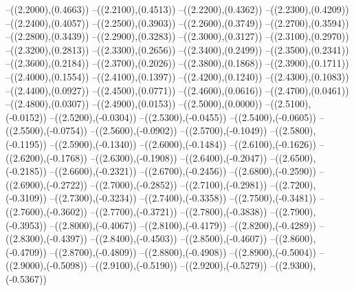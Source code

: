 {	--({\sx*(2.2000)},{\sy*(0.4663)})
	--({\sx*(2.2100)},{\sy*(0.4513)})
	--({\sx*(2.2200)},{\sy*(0.4362)})
	--({\sx*(2.2300)},{\sy*(0.4209)})
	--({\sx*(2.2400)},{\sy*(0.4057)})
	--({\sx*(2.2500)},{\sy*(0.3903)})
	--({\sx*(2.2600)},{\sy*(0.3749)})
	--({\sx*(2.2700)},{\sy*(0.3594)})
	--({\sx*(2.2800)},{\sy*(0.3439)})
	--({\sx*(2.2900)},{\sy*(0.3283)})
	--({\sx*(2.3000)},{\sy*(0.3127)})
	--({\sx*(2.3100)},{\sy*(0.2970)})
	--({\sx*(2.3200)},{\sy*(0.2813)})
	--({\sx*(2.3300)},{\sy*(0.2656)})
	--({\sx*(2.3400)},{\sy*(0.2499)})
	--({\sx*(2.3500)},{\sy*(0.2341)})
	--({\sx*(2.3600)},{\sy*(0.2184)})
	--({\sx*(2.3700)},{\sy*(0.2026)})
	--({\sx*(2.3800)},{\sy*(0.1868)})
	--({\sx*(2.3900)},{\sy*(0.1711)})
	--({\sx*(2.4000)},{\sy*(0.1554)})
	--({\sx*(2.4100)},{\sy*(0.1397)})
	--({\sx*(2.4200)},{\sy*(0.1240)})
	--({\sx*(2.4300)},{\sy*(0.1083)})
	--({\sx*(2.4400)},{\sy*(0.0927)})
	--({\sx*(2.4500)},{\sy*(0.0771)})
	--({\sx*(2.4600)},{\sy*(0.0616)})
	--({\sx*(2.4700)},{\sy*(0.0461)})
	--({\sx*(2.4800)},{\sy*(0.0307)})
	--({\sx*(2.4900)},{\sy*(0.0153)})
	--({\sx*(2.5000)},{\sy*(0.0000)})
	--({\sx*(2.5100)},{\sy*(-0.0152)})
	--({\sx*(2.5200)},{\sy*(-0.0304)})
	--({\sx*(2.5300)},{\sy*(-0.0455)})
	--({\sx*(2.5400)},{\sy*(-0.0605)})
	--({\sx*(2.5500)},{\sy*(-0.0754)})
	--({\sx*(2.5600)},{\sy*(-0.0902)})
	--({\sx*(2.5700)},{\sy*(-0.1049)})
	--({\sx*(2.5800)},{\sy*(-0.1195)})
	--({\sx*(2.5900)},{\sy*(-0.1340)})
	--({\sx*(2.6000)},{\sy*(-0.1484)})
	--({\sx*(2.6100)},{\sy*(-0.1626)})
	--({\sx*(2.6200)},{\sy*(-0.1768)})
	--({\sx*(2.6300)},{\sy*(-0.1908)})
	--({\sx*(2.6400)},{\sy*(-0.2047)})
	--({\sx*(2.6500)},{\sy*(-0.2185)})
	--({\sx*(2.6600)},{\sy*(-0.2321)})
	--({\sx*(2.6700)},{\sy*(-0.2456)})
	--({\sx*(2.6800)},{\sy*(-0.2590)})
	--({\sx*(2.6900)},{\sy*(-0.2722)})
	--({\sx*(2.7000)},{\sy*(-0.2852)})
	--({\sx*(2.7100)},{\sy*(-0.2981)})
	--({\sx*(2.7200)},{\sy*(-0.3109)})
	--({\sx*(2.7300)},{\sy*(-0.3234)})
	--({\sx*(2.7400)},{\sy*(-0.3358)})
	--({\sx*(2.7500)},{\sy*(-0.3481)})
	--({\sx*(2.7600)},{\sy*(-0.3602)})
	--({\sx*(2.7700)},{\sy*(-0.3721)})
	--({\sx*(2.7800)},{\sy*(-0.3838)})
	--({\sx*(2.7900)},{\sy*(-0.3953)})
	--({\sx*(2.8000)},{\sy*(-0.4067)})
	--({\sx*(2.8100)},{\sy*(-0.4179)})
	--({\sx*(2.8200)},{\sy*(-0.4289)})
	--({\sx*(2.8300)},{\sy*(-0.4397)})
	--({\sx*(2.8400)},{\sy*(-0.4503)})
	--({\sx*(2.8500)},{\sy*(-0.4607)})
	--({\sx*(2.8600)},{\sy*(-0.4709)})
	--({\sx*(2.8700)},{\sy*(-0.4809)})
	--({\sx*(2.8800)},{\sy*(-0.4908)})
	--({\sx*(2.8900)},{\sy*(-0.5004)})
	--({\sx*(2.9000)},{\sy*(-0.5098)})
	--({\sx*(2.9100)},{\sy*(-0.5190)})
	--({\sx*(2.9200)},{\sy*(-0.5279)})
	--({\sx*(2.9300)},{\sy*(-0.5367)})
}
